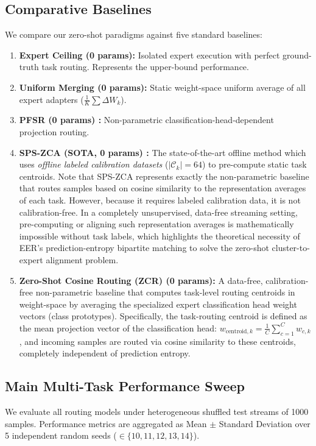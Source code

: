 \subsection{Comparative Baselines}
We compare our zero-shot paradigms against five standard baselines:
\begin{enumerate}
    \item \textbf{Expert Ceiling (0 params):} Isolated expert execution with perfect ground-truth task routing. Represents the upper-bound performance.
    \item \textbf{Uniform Merging (0 params):} Static weight-space uniform average of all expert adapters ($\frac{1}{K}\sum \Delta W_k$).
    \item \textbf{PFSR (0 params) \cite{pfsr}:} Non-parametric classification-head-dependent projection routing.
    \item \textbf{SPS-ZCA (SOTA, 0 params) \cite{sps_zca}:} The state-of-the-art offline method which uses \emph{offline labeled calibration datasets} ($|\mathcal{C}_k|=64$) to pre-compute static task centroids. Note that SPS-ZCA represents exactly the non-parametric baseline that routes samples based on cosine similarity to the representation averages of each task. However, because it requires labeled calibration data, it is not calibration-free. In a completely unsupervised, data-free streaming setting, pre-computing or aligning such representation averages is mathematically impossible without task labels, which highlights the theoretical necessity of EER's prediction-entropy bipartite matching to solve the zero-shot cluster-to-expert alignment problem.
    \item \textbf{Zero-Shot Cosine Routing (ZCR) (0 params):} A data-free, calibration-free non-parametric baseline that computes task-level routing centroids in weight-space by averaging the specialized expert classification head weight vectors (class prototypes). Specifically, the task-routing centroid is defined as the mean projection vector of the classification head: $w_{\text{centroid}, k} = \frac{1}{C}\sum_{c=1}^C w_{c, k}$, and incoming samples are routed via cosine similarity to these centroids, completely independent of prediction entropy.
\end{enumerate}

\subsection{Main Multi-Task Performance Sweep}
We evaluate all routing models under heterogeneous shuffled test streams of 1000 samples. Performance metrics are aggregated as Mean $\pm$ Standard Deviation over 5 independent random seeds ($\in \{10, 11, 12, 13, 14\}$).

